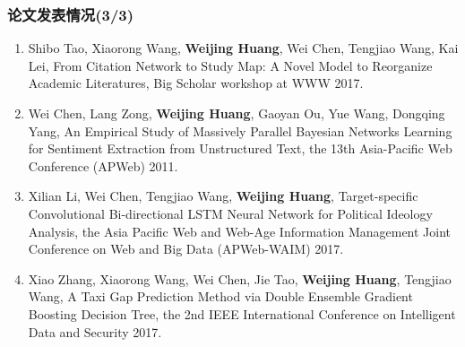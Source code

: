 \begin{transparentFootline}
\begin{frame}
\frametitle{\noindent 论文发表情况(3/3)}

\footnotesize
\begin{enumerate}\addtocounter{enumi}{10}
\item Shibo Tao, Xiaorong Wang, \textbf{Weijing Huang}, Wei Chen, Tengjiao Wang, Kai Lei, From Citation Network to Study Map: A Novel Model to Reorganize Academic Literatures, Big Scholar workshop at WWW 2017.
\item Wei Chen, Lang Zong, \textbf{Weijing Huang}, Gaoyan Ou, Yue Wang, Dongqing Yang, An Empirical Study of Massively Parallel Bayesian Networks Learning for Sentiment Extraction from Unstructured Text, the 13th Asia-Pacific Web Conference (APWeb) 2011. 
\item Xilian Li, Wei Chen, Tengjiao Wang, \textbf{Weijing Huang}, Target-specific Convolutional Bi-directional LSTM Neural Network for Political Ideology Analysis, the Asia Pacific Web and Web-Age Information Management Joint Conference on Web and Big Data (APWeb-WAIM) 2017.
\item Xiao Zhang, Xiaorong Wang, Wei Chen, Jie Tao, \textbf{Weijing Huang}, Tengjiao Wang, A Taxi Gap Prediction Method via Double Ensemble Gradient Boosting Decision Tree, the 2nd IEEE International Conference on Intelligent Data and Security 2017.
\end{enumerate}
\end{frame}
\end{transparentFootline}

